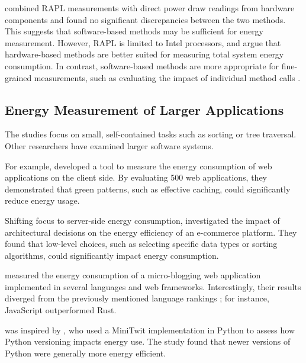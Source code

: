 \documentclass[main.tex]{subfiles}
\begin{document}
\textcite{Gordillo_Calero_Moraga_García_Fernandes_Abreu_Saraiva_2024} combined RAPL measurements with direct power draw readings from hardware components and found no significant discrepancies between the two methods. This suggests that software-based methods may be sufficient for energy measurement. However, RAPL is limited to Intel processors, and \textcite{Wysocki_Miciuła_Plecka_2025} argue that hardware-based methods are better suited for measuring total system energy consumption. In contrast, software-based methods are more appropriate for fine-grained measurements, such as evaluating the impact of individual method calls \cite{Wysocki_Miciuła_Plecka_2025}.

\subsection{Energy Measurement of Larger Applications}

The studies \textcite{pereira2017energy, Pereira_Couto_Ribeiro_Rua_Cunha_Fernandes_Saraiva_2021, Couto_Pereira_Ribeiro_Rua_Saraiva_2017, Gordillo_Calero_Moraga_García_Fernandes_Abreu_Saraiva_2024} focus on small, self-contained tasks such as sorting or tree traversal. Other researchers have examined larger software systems.

For example, \textcite{Philippot_Anglade_Leboucq_2014} developed a tool to measure the energy consumption of web applications on the client side. By evaluating 500 web applications, they demonstrated that green patterns, such as effective caching, could significantly reduce energy usage.

Shifting focus to server-side energy consumption, \textcite{Dutta_Vandermeer_2023} investigated the impact of architectural decisions on the energy efficiency of an e-commerce platform. They found that low-level choices, such as selecting specific data types or sorting algorithms, could significantly impact energy consumption.

\textcite{Pfeiffer_Trindade_Meding_Harwick} measured the energy consumption of a micro-blogging web application implemented in several languages and web frameworks. Interestingly, their results diverged from the previously mentioned language rankings \cite{pereira2017energy, Pereira_Couto_Ribeiro_Rua_Cunha_Fernandes_Saraiva_2021, Couto_Pereira_Ribeiro_Rua_Saraiva_2017, Gordillo_Calero_Moraga_García_Fernandes_Abreu_Saraiva_2024}; for instance, JavaScript outperformed Rust.

\textcite{Pfeiffer_Trindade_Meding_Harwick} was inspired by \textcite{Pfeiffer_2024}, who used a MiniTwit implementation in Python to assess how Python versioning impacts energy use. The study found that newer versions of Python were generally more energy efficient.
\end{document}
